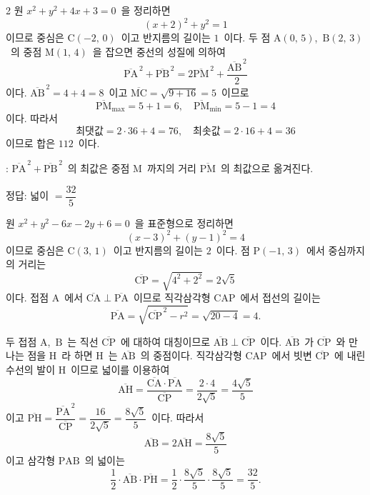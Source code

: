 \documentclass[10pt,fleqn]{article}
\begin{document}
\begin{multicols*}{2}
원 $x^2 + y^2 + 4x + 3 = 0$\ 을 정리하면
\[ (x+2)^2 + y^2 = 1 \]
이므로 중심은 $\mathrm{C}(-2,\, 0)$\ 이고 반지름의 길이는 $1$\ 이다. 두 점 $\mathrm{A}(0,\, 5)$,\ $\mathrm{B}(2,\, 3)$\ 의 중점 $\mathrm{M}(1,\, 4)$\ 을 잡으면 중선의 성질에 의하여
\[ \overline{\mathrm{PA}}^{\,2} + \overline{\mathrm{PB}}^{\,2} = 2\overline{\mathrm{PM}}^{\,2} + \dfrac{\overline{\mathrm{AB}}^{\,2}}{2} \]
이다. $\overline{\mathrm{AB}}^{\,2} = 4 + 4 = 8$\ 이고 $\overline{\mathrm{MC}} = \sqrt{9 + 16} = 5$\ 이므로
\[ \overline{\mathrm{PM}}_{\max} = 5 + 1 = 6,\quad \overline{\mathrm{PM}}_{\min} = 5 - 1 = 4 \]
이다. 따라서
\[ \text{최댓값} = 2 \cdot 36 + 4 = 76,\quad \text{최솟값} = 2 \cdot 16 + 4 = 36 \]
이므로 합은 $112$\ 이다.

\begin{dmcriticalpoint}
: $\overline{\mathrm{PA}}^{\,2} + \overline{\mathrm{PB}}^{\,2}$\ 의 최값은 중점 $\mathrm{M}$\ 까지의 거리 $\overline{\mathrm{PM}}$\ 의 최값으로 옮겨진다.
\end{dmcriticalpoint}

\begin{dmanswerbox}
정답: 넓이 $=\dfrac{32}{5}$
\end{dmanswerbox}

원 $x^2 + y^2 - 6x - 2y + 6 = 0$\ 을 표준형으로 정리하면
\[ (x - 3)^2 + (y - 1)^2 = 4 \]
이므로 중심은 $\mathrm{C}(3,\, 1)$\ 이고 반지름의 길이는 $2$\ 이다. 점 $\mathrm{P}(-1,\, 3)$\ 에서 중심까지의 거리는
\[ \overline{\mathrm{CP}} = \sqrt{4^2 + 2^2} = 2\sqrt{5} \]
이다. 접점 $\mathrm{A}$\ 에서 $\overline{\mathrm{CA}} \perp \overline{\mathrm{PA}}$\ 이므로 직각삼각형 $\mathrm{CAP}$\ 에서 접선의 길이는
\[ \overline{\mathrm{PA}} = \sqrt{\overline{\mathrm{CP}}^{\,2} - r^2} = \sqrt{20 - 4} = 4. \]

두 접점 $\mathrm{A}$,\ $\mathrm{B}$\ 는 직선 $\overline{\mathrm{CP}}$\ 에 대하여 대칭이므로 $\overline{\mathrm{AB}} \perp \overline{\mathrm{CP}}$\ 이다. $\overline{\mathrm{AB}}$\ 가 $\overline{\mathrm{CP}}$\ 와 만나는 점을 $\mathrm{H}$\ 라 하면 $\mathrm{H}$\ 는 $\overline{\mathrm{AB}}$\ 의 중점이다. 직각삼각형 $\mathrm{CAP}$\ 에서 빗변 $\overline{\mathrm{CP}}$\ 에 내린 수선의 발이 $\mathrm{H}$\ 이므로 넓이를 이용하여
\[ \overline{\mathrm{AH}} = \dfrac{\overline{\mathrm{CA}} \cdot \overline{\mathrm{PA}}}{\overline{\mathrm{CP}}} = \dfrac{2 \cdot 4}{2\sqrt{5}} = \dfrac{4\sqrt{5}}{5} \]
이고 $\overline{\mathrm{PH}} = \dfrac{\overline{\mathrm{PA}}^{\,2}}{\overline{\mathrm{CP}}} = \dfrac{16}{2\sqrt{5}} = \dfrac{8\sqrt{5}}{5}$\ 이다. 따라서
\[ \overline{\mathrm{AB}} = 2\overline{\mathrm{AH}} = \dfrac{8\sqrt{5}}{5} \]
이고 삼각형 $\mathrm{PAB}$\ 의 넓이는
\[ \dfrac{1}{2} \cdot \overline{\mathrm{AB}} \cdot \overline{\mathrm{PH}} = \dfrac{1}{2} \cdot \dfrac{8\sqrt{5}}{5} \cdot \dfrac{8\sqrt{5}}{5} = \dfrac{32}{5}. \]


\end{multicols*}
\end{document}
